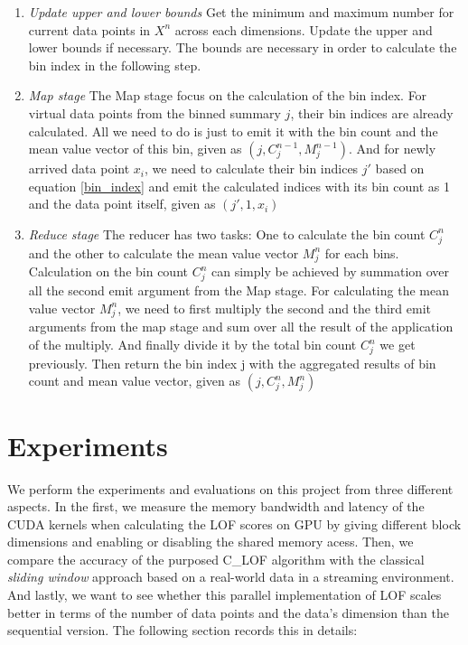 \documentclass[11pt]{article}       %
\begin{document}
\begin{enumerate}
 \item {\textit{Update upper and lower bounds}}
 	Get the minimum and maximum number for current data points in $X^n$ across each dimensions. Update the upper and lower bounds if necessary. The bounds are necessary in order to calculate the bin index in the following step.
 \item {\textit{Map stage}}
 	The Map stage focus on the calculation of the bin index. For virtual data points from the binned summary $j$, their bin indices are already calculated. All we need to do is just to emit it with the bin count and the mean value vector of this bin, given as $(j, C_j^{n-1}, M_j^{n-1})$. And for newly arrived data point $x_i$, we need to calculate their bin indices $j'$ based on equation \ref{bin_index} and emit the calculated indices with its bin count as 1 and the data point itself, given as ${(j', 1, x_i)}$
\item {\textit{Reduce stage}}
	The reducer has two tasks: One to calculate the bin count $C_j^n$ and the other to calculate the mean value vector $M_j^n$ for each bins. Calculation on the bin count $C_j^n$ can simply be achieved by summation over all the second emit argument from the Map stage. For calculating the mean value vector $M_j^n$, we need to first multiply the second and the third emit arguments from the map stage and sum over all the result of the application of the multiply. And finally divide it by the total bin count $C_j^n$ we get previously. Then return the bin index j with the aggregated results of bin count and mean value vector, given as $(j, C_j^n, M_j^{n})$
\end{enumerate}

\section{Experiments} \label{expert}

We perform the experiments and evaluations on this project from three different aspects. In the first, we measure the memory bandwidth and latency of the CUDA kernels when calculating the LOF scores on GPU by giving different block dimensions and enabling or disabling the shared memory acess. Then, we compare the accuracy of the purposed C\_LOF algorithm with the classical \textit{sliding window} approach based on a real-world data in a streaming environment. And lastly, we want to see whether this parallel implementation of LOF scales better in terms of the number of data points and the data's dimension than the sequential version. The following section records this in details: 
\end{document}
